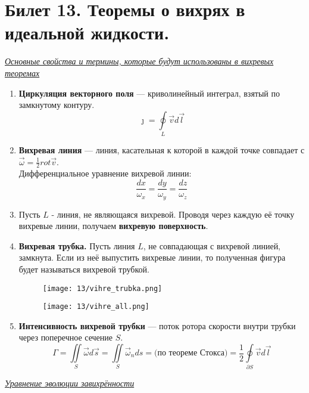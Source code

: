 \newpage
\section{Билет 13. Теоремы о вихрях в идеальной жидкости.}
\begin{center}
  \textit{\underline{Основные свойства и термины, которые будут использованы в вихревых теоремах}}
\end{center}
\begin{enumerate}
  \item
        \textbf{Циркуляция векторного поля} — криволинейный интеграл, взятый по замкнутому контуру.
        $$\jmath = \oint  \limits_{L}\vec{v}d\vec{l}$$
  \item
        \textbf{Вихревая линия} — линия, касательная к которой в каждой точке совпадает с $\vec{\omega} = \frac{1}{2}rot\vec{v}$.\\ Дифференциальное уравнение вихревой линии:
        $$\frac{dx}{\omega_x} =\frac{dy}{\omega_y} = \frac{dz}{\omega_z}$$
  \item
        Пусть $L$ - линия, не являющаяся вихревой. Проводя через каждую её точку вихревые линии, получаем \textbf{вихревую поверхность}.
  \item
        \textbf{Вихревая трубка.}
        Пусть линия $L$, не совпадающая с вихревой линией, замкнута. Если из неё выпустить вихревые линии, то полученная фигура будет называться вихревой трубкой.
        \begin{figure}[!htbp]
          \begin{minipage}{0.33\linewidth}
            \centering
            \texttt{[image: 13/vihre\_trubka.png]}
          \end{minipage}\hfill
          \begin{minipage}{0.66\linewidth}
            \centering
            \texttt{[image: 13/vihre\_all.png]}
          \end{minipage}
        \end{figure}
  \item \textbf{Интенсивность вихревой трубки} — поток ротора скорости внутри трубки через поперечное сечение $S$.
        $$
          \Gamma = \iint\limits_{S}\vec{\omega}d\vec{s}  =\iint\limits_{S}\vec{\omega}_nds =\text{(по теореме Стокса)} = \frac{1}{2}  \oint  \limits_{\partial S}\vec{v}d\vec{l}$$
\end{enumerate}
\begin{center}
  \textit{\underline{Уравнение эволюции завихрённости}}
\end{center}
